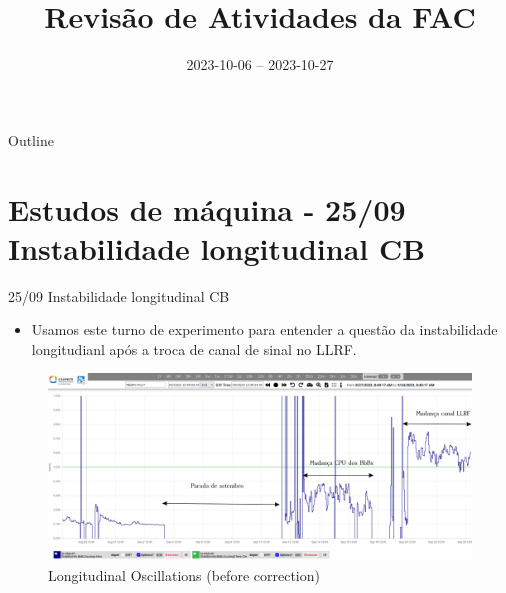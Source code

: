 \documentclass{beamer}					%
\title{Revisão de Atividades da FAC}	%
\institute{LNLS.DAC.FAC}					%
\date{2023-10-06 -- 2023-10-27}									%
\begin{document}
\begin{frame}
  \titlepage
  \href{https://github.com/lnls-fac/doc-review-dac-fac}{}
  \href{https://www.overleaf.com/read/sbdjxtzfchrm}{}
  
  
\end{frame}

\begin{frame}{Outline}
  \tableofcontents
\end{frame}

%


\section{Estudos de máquina - 25/09 Instabilidade longitudinal CB}


\begin{frame}{25/09 Instabilidade longitudinal CB}

    \begin{itemize}
		\item Usamos este turno de experimento para entender a questão da instabilidade longitudianl após a troca de canal de sinal no LLRF.
	\end{itemize}

    \begin{figure}[H]
		\centering
        \includegraphics[width=.9\textwidth]{figures/long-osc-before-correction.png}
        \caption{Longitudinal Oscillations (before correction)}
        \label{fig:figure1}
    \end{figure}
    
\end{frame}
\end{document}
